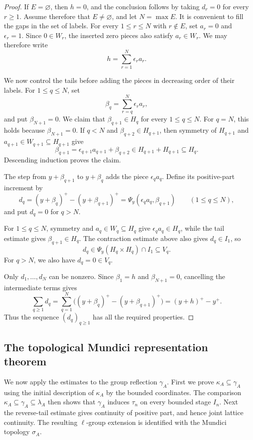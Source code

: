 \documentclass[preprint,3p]{elsarticle}
\theoremstyle{plain}
\theoremstyle{definition}
\numberwithin{equation}{section}
\begin{document}
\begin{proof}
If $E=\varnothing$, then $h=0$, and the conclusion follows by taking
$d_r=0$ for every $r\geq1$.  Assume therefore that $E\neq\varnothing$,
and let $N=\max E$. 
It is convenient to fill the gaps in the set of labels.  
For every $1\leq r\leq N$ with $r\notin E$, set $a_r=0$ and $\epsilon_r=1$.
Since $0\in W_r$, the inserted zero pieces also satisfy $a_r\in W_r$.  
We may therefore write
\[
 h=\sum_{r=1}^N\epsilon_r a_r.
\]

We now control the tails before adding the pieces in decreasing
order of their labels.  For
$1\leq q\leq N$, set
\[
 \beta_q
 =
 \sum_{r=q}^N\epsilon_r a_r,
\]
and put $\beta_{N+1}=0$.  We claim that $\beta_{q+1}\in H_q$ for every
$1\leq q\leq N$.  For $q=N$, this holds because $\beta_{N+1}=0$.
If $q<N$ and $\beta_{q+2}\in H_{q+1}$, then symmetry of $H_{q+1}$
and $a_{q+1}\in W_{q+1}\subseteq H_{q+1}$ give
\[
 \beta_{q+1}=\epsilon_{q+1}a_{q+1}+\beta_{q+2}
 \in H_{q+1}+H_{q+1}\subseteq H_q.
\]
Descending induction proves the claim.

The step from $y+\beta_{q+1}$ to $y+\beta_q$ adds the piece
$\epsilon_q a_q$.  Define its positive-part increment by
\[
 d_q
 =(y+\beta_q)^+-(y+\beta_{q+1})^+
 =\Psi_y(\epsilon_q a_q,\beta_{q+1})
 \qquad(1\leq q\leq N),
\]
and put $d_q=0$ for $q>N$.

For $1\leq q\leq N$, symmetry and $a_q\in W_q\subseteq H_q$
give $\epsilon_q a_q\in H_q$, while the tail estimate gives
$\beta_{q+1}\in H_q$.
The contraction estimate above also gives $d_q\in I_1$, so
\[
 d_q\in\Psi_y(H_q\times H_q)\cap I_1\subseteq V_q.
\]
For $q>N$, we also have $d_q=0\in V_q$.

Only $d_1,\ldots,d_N$ can be nonzero.
Since $\beta_1=h$ and $\beta_{N+1}=0$, cancelling the intermediate terms gives
\[
 \sum_{q\geq1}d_q
 =
 \sum_{q=1}^N\bigl((y+\beta_q)^+-(y+\beta_{q+1})^+\bigr)
 =
 (y+h)^+-y^+.
\]
Thus the sequence $(d_q)_{q\geq1}$ has all the required properties.
\end{proof}

\subsection{The topological Mundici representation theorem}
\label{subsec-exact-lgroup}

We now apply the estimates to the group reflection $\gamma_A$.
First we prove $\kappa_A\subseteq\gamma_A$ using the initial
description of $\kappa_A$ by the bounded coordinates.
The comparison $\kappa_A\subseteq\gamma_A\subseteq\lambda_A$
then shows that $\gamma_A$ induces $\tau_n$ on every bounded stage $I_n$.
Next the reverse-tail estimate gives continuity of positive part,
and hence joint lattice continuity.  The resulting $\ell$-group
extension is identified with the Mundici topology $\sigma_A$.
\end{document}
